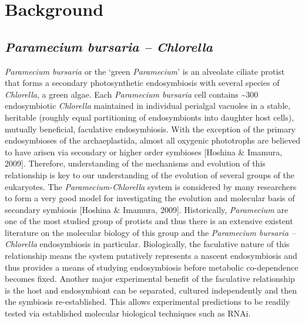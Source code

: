 \section{Background}

\subsection{\textit{Paramecium bursaria – Chlorella}}
\textit{Paramecium bursaria} or the `green \textit{Paramecium}' is an alveolate ciliate protist that forms a secondary photosynthetic endosymbiosis with several species of \textit{Chlorella}, a green algae.  
Each \textit{Paramecium bursaria} cell contains \textasciitilde 300 endosymbiotic \textit{Chlorella} maintained in individual perialgal vacuoles in a stable, heritable (roughly equal partitioning of endosymbionts into daughter host cells), mutually beneficial, faculative endosymbiosis. 
With the exception of the primary endosymbioses of the archaeplastida, almost all oxygenic phototrophs are believed to have arisen via secondary or higher order symbioses [Hoshina \& Imamura, 2009].  
Therefore, understanding of the mechanisms and evolution of this relationship is key to our understanding of the evolution of several groups of the eukaryotes. The \textit{Paramecium-Chlorella} system is considered by many researchers to form a very good model for investigating the evolution and molecular basis of secondary symbiosis [Hoshina \& Imamura, 2009].  
Historically, \textit{Paramecium} are one of the most studied group of protists and thus there is an extensive existent literature on the molecular biology of this group and the \textit{Paramecium bursaria – Chlorella} endosymbiosis in particular.  
Biologically, the faculative nature of this relationship means the system putatively represents a nascent endosymbiosis and thus provides a means of studying endosymbiosis before metabolic co-dependence becomes fixed. 
Another major experimental benefit of the faculative relationship is the host and endosymbiont can be separated, cultured independently and then the symbiosis re-established.  
This allows experimental predictions to be readily tested via established molecular biological techniques such as RNAi.

